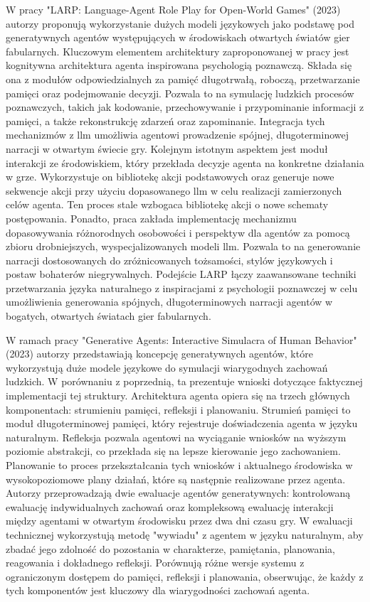 W pracy "LARP: Language-Agent Role Play for Open-World Games" (2023)\cite{larp_language} autorzy
proponują wykorzystanie dużych modeli językowych jako podstawę pod generatywnych agentów
występujących w środowiskach otwartych światów gier fabularnych. Kluczowym elementem architektury
zaproponowanej w pracy jest kognitywna architektura agenta inspirowana psychologią poznawczą. Składa
się ona z modułów odpowiedzialnych za pamięć długotrwałą, roboczą, przetwarzanie pamięci oraz
podejmowanie decyzji. Pozwala to na symulację ludzkich procesów poznawczych, takich jak kodowanie,
przechowywanie i przypominanie informacji z pamięci, a także rekonstrukcję zdarzeń oraz zapominanie.
Integracja tych mechanizmów z \gls{llm} umożliwia agentowi prowadzenie spójnej, długoterminowej narracji w
otwartym świecie gry. Kolejnym istotnym aspektem jest moduł interakcji ze środowiskiem, który przekłada
decyzje agenta na konkretne działania w grze. Wykorzystuje on bibliotekę akcji podstawowych oraz generuje
nowe sekwencje akcji przy użyciu dopasowanego \gls{llm} w celu realizacji zamierzonych celów agenta. Ten proces
stale wzbogaca bibliotekę akcji o nowe schematy postępowania. Ponadto, praca zakłada implementację
mechanizmu dopasowywania różnorodnych osobowości i perspektyw dla agentów za pomocą zbioru
drobniejszych, wyspecjalizowanych modeli \gls{llm}. Pozwala to na generowanie narracji dostosowanych do
zróżnicowanych tożsamości, stylów językowych i postaw bohaterów niegrywalnych. Podejście LARP łączy
zaawansowane techniki przetwarzania języka naturalnego z inspiracjami z psychologii poznawczej w celu
umożliwienia generowania spójnych, długoterminowych narracji agentów w bogatych, otwartych światach gier
fabularnych\cite{larp_language}.

W ramach pracy "Generative Agents: Interactive Simulacra of Human Behavior" (2023)\cite{ai_town_ref} autorzy przedstawiają koncepcję
generatywnych agentów, które wykorzystują duże modele językowe do symulacji wiarygodnych zachowań
ludzkich. W porównaniu z poprzednią, ta prezentuje wnioski dotyczące faktycznej implementacji tej struktury.
Architektura agenta opiera się na trzech głównych komponentach: strumieniu pamięci, refleksji
i planowaniu. Strumień pamięci to moduł długoterminowej pamięci, który rejestruje doświadczenia agenta
w języku naturalnym. Refleksja pozwala agentowi na wyciąganie wniosków na wyższym poziomie abstrakcji,
co przekłada się na lepsze kierowanie jego zachowaniem. Planowanie to proces przekształcania tych
wniosków i aktualnego środowiska w wysokopoziomowe plany działań, które są następnie realizowane przez
agenta. Autorzy przeprowadzają dwie ewaluacje agentów generatywnych: kontrolowaną ewaluację indywidualnych
zachowań oraz kompleksową ewaluację interakcji między agentami w otwartym środowisku przez dwa dni czasu gry.
W ewaluacji technicznej wykorzystują metodę "wywiadu" z agentem w języku naturalnym, aby zbadać jego zdolność
do pozostania w charakterze, pamiętania, planowania, reagowania i dokładnego refleksji. Porównują różne
wersje systemu z ograniczonym dostępem do pamięci, refleksji i planowania, obserwując, że każdy z tych
komponentów jest kluczowy dla wiarygodności zachowań agenta\cite{ai_town_ref}.

